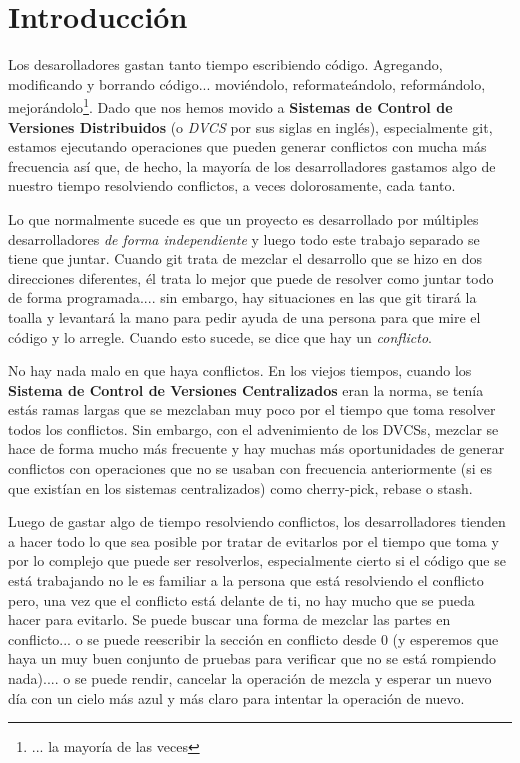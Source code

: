 
\section{Introducción}

Los desarolladores gastan tanto tiempo escribiendo código. Agregando, modificando y borrando código... moviéndolo,
reformateándolo, reformándolo, mejorándolo\footnote{... la mayoría de las veces}. Dado que nos hemos movido a
{\bf Sistemas de Control de Versiones Distribuidos} (o {\it DVCS} por sus siglas en inglés), especialmente git,
estamos ejecutando operaciones que pueden generar conflictos con mucha más frecuencia así que, de hecho, la mayoría
de los desarrolladores gastamos algo de nuestro tiempo resolviendo conflictos, a veces dolorosamente, cada tanto.

Lo que normalmente sucede es que un proyecto es desarrollado por múltiples desarrolladores {\it de forma independiente}
y luego todo este trabajo separado se tiene que juntar. Cuando git trata de mezclar el desarrollo que se hizo en dos direcciones
diferentes, él trata lo mejor que puede de resolver como juntar todo de forma programada.... sin embargo, hay situaciones en las que
git tirará la toalla y levantará la mano para pedir ayuda de una persona para que mire el código y lo arregle. Cuando esto
sucede, se dice que hay un {\it conflicto}.

No hay nada malo en que haya conflictos. En los viejos tiempos, cuando los {\bf Sistema de Control de Versiones Centralizados} eran la
norma, se tenía estás ramas largas que se mezclaban muy poco por el tiempo que toma resolver todos los conflictos. Sin embargo, con el
advenimiento de los DVCSs, mezclar se hace de forma mucho más frecuente y hay muchas más oportunidades de generar conflictos con
operaciones que no se usaban con frecuencia anteriormente (si es que existían en los sistemas centralizados) como cherry-pick,
rebase o stash.

Luego de gastar algo de tiempo resolviendo conflictos, los desarrolladores tienden a hacer todo lo que sea posible por tratar de
evitarlos por el tiempo que toma y por lo complejo que puede ser resolverlos, especialmente cierto si el código que se está
trabajando no le es familiar a la persona que está resolviendo el conflicto pero, una vez que el conflicto está delante de
ti, no hay mucho que se pueda hacer para evitarlo. Se puede buscar una forma de mezclar las partes en conflicto... o se puede
reescribir la sección en conflicto desde 0 (y esperemos que haya un muy buen conjunto de pruebas para verificar que no se está rompiendo
nada).... o se puede rendir, cancelar la operación de mezcla y esperar un nuevo día con un cielo más azul y más claro para intentar
la operación de nuevo.

